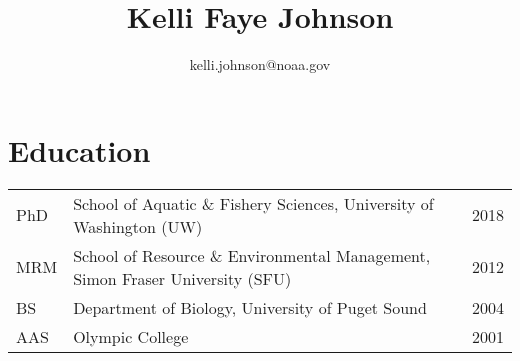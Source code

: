 \documentclass[10pt]{article}
\title{\bfseries\Huge Kelli Faye Johnson}
\author{kelli.johnson@noaa.gov}
\date{}
\begin{document}

\maketitle
\vspace{-15mm}
\noindent\makebox[\linewidth]{\rule{\paperwidth}{0.4pt}}
\section*{Education}
\begin{tabular}{lll}
PhD & School of Aquatic \& Fishery Sciences, University of Washington (UW) & 2018 \\
MRM & School of Resource \& Environmental Management, Simon Fraser University (SFU) & 2012 \\
BS & Department of Biology, University of Puget Sound & 2004 \\
AAS & Olympic College & 2001 \\
\end{tabular}
\end{document}
